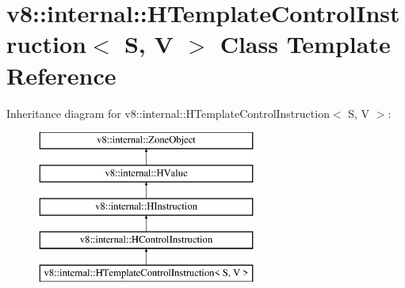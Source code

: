 \hypertarget{classv8_1_1internal_1_1_h_template_control_instruction}{}\section{v8\+:\+:internal\+:\+:H\+Template\+Control\+Instruction$<$ S, V $>$ Class Template Reference}
\label{classv8_1_1internal_1_1_h_template_control_instruction}
Inheritance diagram for v8\+:\+:internal\+:\+:H\+Template\+Control\+Instruction$<$ S, V $>$\+:\begin{figure}[H]
\begin{center}
\leavevmode
\includegraphics[height=5.000000cm]{classv8_1_1internal_1_1_h_template_control_instruction}
\end{center}
\end{figure}
